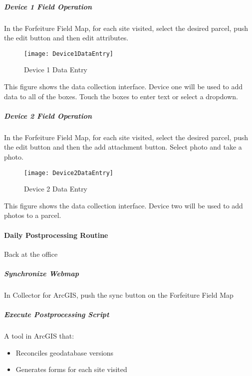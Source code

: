 \documentclass[class=article , crop=false, titlepage, twoside, multi={itemize, figure, verbatim}, float=false]{standalone}
\begin{document}
\clearpage
\subparagraph{Device 1 Field Operation}
\subparagraph*{}In the Forfeiture Field Map, for each site visited, select the desired parcel, push the edit button and then edit attributes.

\begin{wrapfigure}{r}{0.5\textwidth}
\centering
\texttt{[image: Device1DataEntry]}
\caption {Device 1 Data Entry}
\end{wrapfigure}
\vspace{1in}

This figure shows the data collection interface.  Device one will be used to add data to all of the boxes.  Touch the boxes to enter text or select a dropdown.

\clearpage
\subparagraph{Device 2 Field Operation} 
\subparagraph*{}In the Forfeiture Field Map, for each site visited, select the desired parcel, push the edit button and then the add attachment button.  Select photo and take a photo.

\begin{wrapfigure}{l}{0.5\textwidth}
\centering
\texttt{[image: Device2DataEntry]}
\caption {Device 2 Data Entry}
\end{wrapfigure}
\vspace{1in}

This figure shows the data collection interface.  Device two will be used to add photos to a parcel.

\clearpage
\paragraph{Daily Postprocessing Routine}Back at the office
\subparagraph{Synchronize Webmap}In Collector for ArcGIS, push the sync button on the Forfeiture Field Map
\subparagraph{Execute Postprocessing Script}A tool in ArcGIS that:

\begin{itemize}
\item Reconciles geodatabase versions
\item Generates forms for each site visited



\end{itemize}

\end{document}
